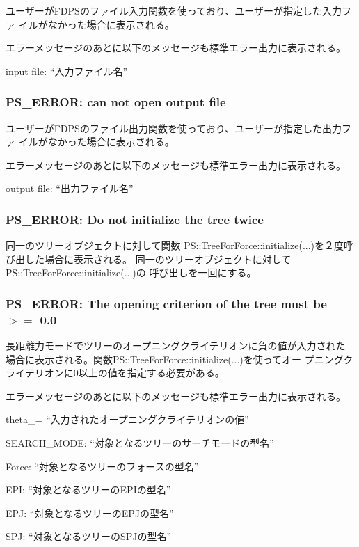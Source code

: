 ユーザーがFDPSのファイル入力関数を使っており、ユーザーが指定した入力ファ
イルがなかった場合に表示される。

エラーメッセージのあとに以下のメッセージも標準エラー出力に表示される。

\begin{screen}
  input file: ``入力ファイル名''
\end{screen}


\subsubsection{PS\_ERROR: can not open output file}

ユーザーがFDPSのファイル出力関数を使っており、ユーザーが指定した出力ファ
イルがなかった場合に表示される。

エラーメッセージのあとに以下のメッセージも標準エラー出力に表示される。

\begin{screen}
  output file: ``出力ファイル名''
\end{screen}


\subsubsection{PS\_ERROR: Do not initialize the tree twice}

同一のツリーオブジェクトに対して関数
{PS::TreeForForce::initialize(...)}を２度呼び出した場合に表示される。
同一のツリーオブジェクトに対して{PS::TreeForForce::initialize(...)}の
呼び出しを一回にする。


\subsubsection{PS\_ERROR: The opening criterion of the tree must be $>=$ 0.0}

長距離力モードでツリーのオープニングクライテリオンに負の値が入力された
場合に表示される。関数{PS::TreeForForce::initialize(...)}を使ってオー
プニングクライテリオンに0以上の値を指定する必要がある。

エラーメッセージのあとに以下のメッセージも標準エラー出力に表示される。

\begin{screen}
  theta\_= ``入力されたオープニングクライテリオンの値''

  SEARCH\_MODE: ``対象となるツリーのサーチモードの型名''

  Force: ``対象となるツリーのフォースの型名''

  EPI: ``対象となるツリーのEPIの型名''

  EPJ: ``対象となるツリーのEPJの型名''

  SPJ: ``対象となるツリーのSPJの型名''
  
\end{screen}

